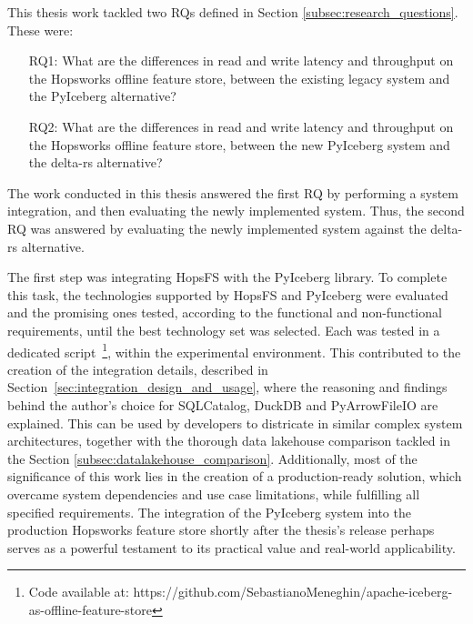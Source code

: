 This thesis work tackled two \glspl{RQ} defined in Section \ref{subsec:research_questions}. These were: 
\begin{enumerate}
    \item[RQ1:] What are the differences in read and write latency and throughput on the Hopsworks offline feature store, between the existing legacy system and the PyIceberg alternative?
    \item[RQ2:] What are the differences in read and write latency and throughput on the Hopsworks offline feature store, between the new PyIceberg system and the delta-rs alternative?
\end{enumerate}
The work conducted in this thesis answered the first \gls{RQ} by performing a system integration, and then evaluating the newly implemented system. Thus, the second \gls{RQ} was answered by evaluating the newly implemented system against the delta-rs alternative.

The first step was integrating \gls{HopsFS} with the PyIceberg library. To complete this task, the technologies supported by \gls{HopsFS} and PyIceberg were evaluated and the promising ones tested, according to the functional and non-functional requirements, until the best technology set was selected. Each was tested in a dedicated script~\footnote{Code available at: https://github.com/SebastianoMeneghin/apache-iceberg-as-offline-feature-store}, within the experimental environment. This contributed to the creation of the integration details, described in Section~\ref{sec:integration_design_and_usage}, where the reasoning and findings behind the author's choice for SQLCatalog, DuckDB and PyArrowFileIO are explained. This can be used by developers to districate in similar complex system architectures, together with the thorough data lakehouse comparison tackled in the Section \ref{subsec:datalakehouse_comparison}. Additionally, most of the significance of this work lies in the creation of a production-ready solution, which overcame system dependencies and use case limitations, while fulfilling all specified requirements. The integration of the PyIceberg system into the production Hopsworks feature store shortly after the thesis's release perhaps serves as a powerful testament to its practical value and real-world applicability.

